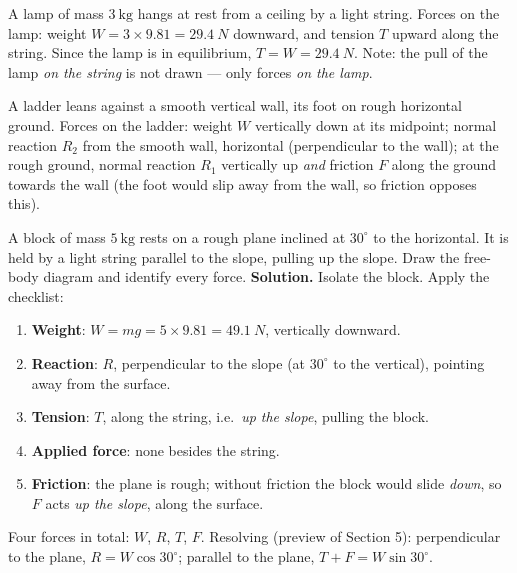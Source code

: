 \documentclass[11pt]{article}
\begin{document}
\begin{exemplebox}
A lamp of mass $3\ \mathrm{kg}$ hangs at rest from a ceiling by a light string. Forces on the lamp: weight $W = 3 \times 9.81 = \SI{29.4}{N}$ downward, and tension $T$ upward along the string. Since the lamp is in equilibrium, $T = W = \SI{29.4}{N}$. Note: the pull of the lamp \emph{on the string} is not drawn — only forces \emph{on the lamp}.
\end{exemplebox}

\begin{exemplebox}
A ladder leans against a smooth vertical wall, its foot on rough horizontal ground. Forces on the ladder: weight $W$ vertically down at its midpoint; normal reaction $R_2$ from the smooth wall, horizontal (perpendicular to the wall); at the rough ground, normal reaction $R_1$ vertically up \emph{and} friction $F$ along the ground towards the wall (the foot would slip away from the wall, so friction opposes this).
\end{exemplebox}

\begin{exoresolu}
A block of mass $5\ \mathrm{kg}$ rests on a rough plane inclined at $30^{\circ}$ to the horizontal. It is held by a light string parallel to the slope, pulling up the slope. Draw the free-body diagram and identify every force.
\tcblower
\textbf{Solution.} Isolate the block. Apply the checklist:
\begin{enumerate}
\item \textbf{Weight}: $W = mg = 5 \times 9.81 = \SI{49.1}{N}$, vertically downward.
\item \textbf{Reaction}: $R$, perpendicular to the slope (at $30^{\circ}$ to the vertical), pointing away from the surface.
\item \textbf{Tension}: $T$, along the string, i.e.\ \emph{up the slope}, pulling the block.
\item \textbf{Applied force}: none besides the string.
\item \textbf{Friction}: the plane is rough; without friction the block would slide \emph{down}, so $F$ acts \emph{up the slope}, along the surface.
\end{enumerate}
Four forces in total: $W$, $R$, $T$, $F$. Resolving (preview of Section 5): perpendicular to the plane, $R = W\cos 30^{\circ}$; parallel to the plane, $T + F = W\sin 30^{\circ}$.
\end{exoresolu}
\end{document}
